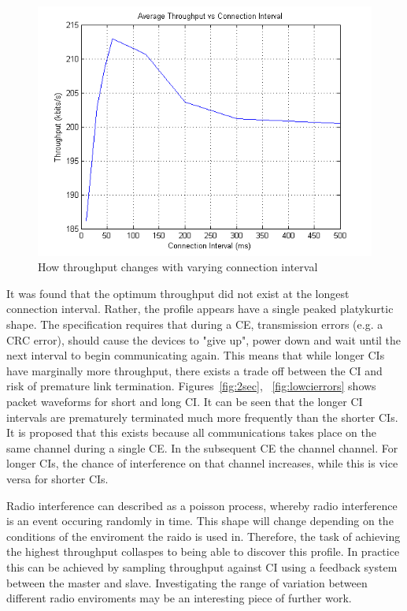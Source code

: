 \documentclass[]{article}
\begin{document}
\begin{figure}[H]
	\begin{center}
		\includegraphics[width = \textwidth]{civsdatarate}
	\end{center}
	\caption{How throughput changes with varying connection interval}
	\label{fig:civsdatarate}
\end{figure}

It was found that the optimum throughput did not exist at the longest connection interval. Rather, the profile appears have a single peaked platykurtic shape. The specification requires that during a \ac{CE}, transmission errors (e.g. a CRC error), should cause the devices to "give up", power down and wait until the next interval to begin communicating again. This means that while longer \ac{CI}s have marginally more throughput,  there exists a trade off between the \ac{CI} and risk of premature link termination. Figures~\ref{fig:2sec}, ~\ref{fig:lowcierrors} shows packet waveforms for short and long \ac{CI}. It can be seen that the longer \ac{CI} intervals are prematurely terminated much more frequently than the shorter \ac{CI}s. It is proposed that this exists because all communications takes place on the same channel during a single \ac{CE}. In the subsequent \ac{CE} the channel channel. For longer \ac{CI}s, the chance of interference on that channel increases, while this is vice versa for shorter \ac{CI}s.

Radio interference can described as a poisson process, whereby radio interference is an event occuring randomly in time. This shape will change depending on the conditions of the enviroment the raido is used in. Therefore, the task of achieving the highest throughput collaspes to being able to discover this profile. In practice this can be achieved by sampling throughput against \ac{CI} using a feedback system between the master and slave. Investigating the range of variation between different radio enviroments may be an interesting piece of further work. 
\end{document}
